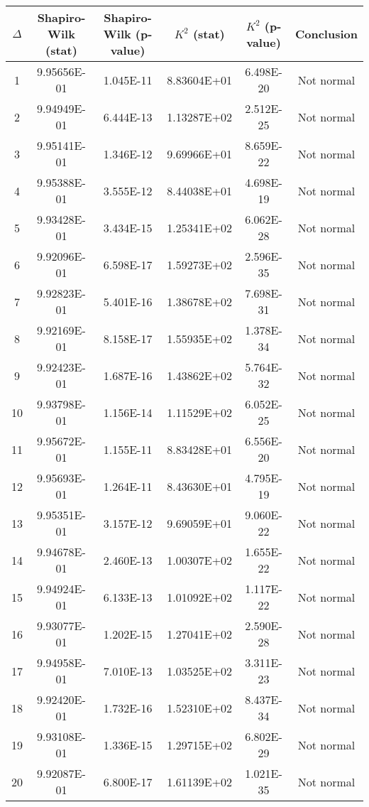 \begin{table}[h]
	\begin{tabular}{|c|c|c|c|c|c|}
		\hline
		$\Delta$ &  Shapiro-Wilk (stat) & Shapiro-Wilk (p-value) & $K^2$ (stat) & $K^2$ (p-value) & Conclusion\\\hline
		\hline
		1 & 9.95656E-01 & 1.045E-11 & 8.83604E+01 & 6.498E-20 & Not normal\\\hline
		2 & 9.94949E-01 & 6.444E-13 & 1.13287E+02 & 2.512E-25 & Not normal\\\hline
		3 & 9.95141E-01 & 1.346E-12 & 9.69966E+01 & 8.659E-22 & Not normal\\\hline
		4 & 9.95388E-01 & 3.555E-12 & 8.44038E+01 & 4.698E-19 & Not normal\\\hline
		5 & 9.93428E-01 & 3.434E-15 & 1.25341E+02 & 6.062E-28 & Not normal\\\hline
		6 & 9.92096E-01 & 6.598E-17 & 1.59273E+02 & 2.596E-35 & Not normal\\\hline
		7 & 9.92823E-01 & 5.401E-16 & 1.38678E+02 & 7.698E-31 & Not normal\\\hline
		8 & 9.92169E-01 & 8.158E-17 & 1.55935E+02 & 1.378E-34 & Not normal\\\hline
		9 & 9.92423E-01 & 1.687E-16 & 1.43862E+02 & 5.764E-32 & Not normal\\\hline
		10 & 9.93798E-01 & 1.156E-14 & 1.11529E+02 & 6.052E-25 & Not normal\\\hline
		11 & 9.95672E-01 & 1.155E-11 & 8.83428E+01 & 6.556E-20 & Not normal\\\hline
		12 & 9.95693E-01 & 1.264E-11 & 8.43630E+01 & 4.795E-19 & Not normal\\\hline
		13 & 9.95351E-01 & 3.157E-12 & 9.69059E+01 & 9.060E-22 & Not normal\\\hline
		14 & 9.94678E-01 & 2.460E-13 & 1.00307E+02 & 1.655E-22 & Not normal\\\hline
		15 & 9.94924E-01 & 6.133E-13 & 1.01092E+02 & 1.117E-22 & Not normal\\\hline
		16 & 9.93077E-01 & 1.202E-15 & 1.27041E+02 & 2.590E-28 & Not normal\\\hline
		17 & 9.94958E-01 & 7.010E-13 & 1.03525E+02 & 3.311E-23 & Not normal\\\hline
		18 & 9.92420E-01 & 1.732E-16 & 1.52310E+02 & 8.437E-34 & Not normal\\\hline
		19 & 9.93108E-01 & 1.336E-15 & 1.29715E+02 & 6.802E-29 & Not normal\\\hline
		20 & 9.92087E-01 & 6.800E-17 & 1.61139E+02 & 1.021E-35 & Not normal\\\hline

\end{tabular}
\end{table}
